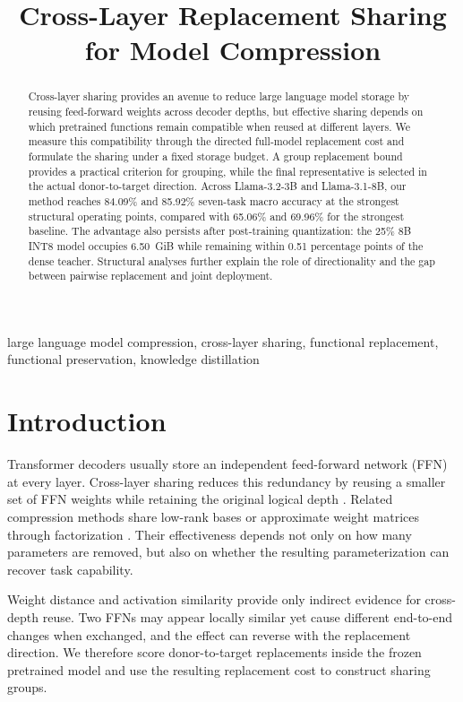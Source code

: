 \documentclass{article}
\title{Cross-Layer Replacement Sharing for Model Compression}
\begin{document}
\ninept
\maketitle

\begin{abstract}
Cross-layer sharing provides an avenue to reduce large language model storage by reusing feed-forward weights across decoder depths, but effective sharing depends on which pretrained functions remain compatible when reused at different layers. We measure this compatibility through the directed full-model replacement cost and formulate the sharing under a fixed storage budget. A group replacement bound provides a practical criterion for grouping, while the final representative is selected in the actual donor-to-target direction. Across Llama-3.2-3B and Llama-3.1-8B, our method reaches 84.09\% and 85.92\% seven-task macro accuracy at the strongest structural operating points, compared with 65.06\% and 69.96\% for the strongest baseline. The advantage also persists after post-training quantization: the 25\% 8B INT8 model occupies 6.50~GiB while remaining within 0.51 percentage points of the dense teacher. Structural analyses further explain the role of directionality and the gap between pairwise replacement and joint deployment.
\end{abstract}
\begin{keywords}
large language model compression, cross-layer sharing, functional replacement, functional preservation, knowledge distillation
\end{keywords}

\section{Introduction}
Transformer decoders usually store an independent feed-forward network (FFN)
at every layer. Cross-layer sharing reduces this redundancy by reusing a
smaller set of FFN weights while retaining the original logical depth
\cite{dehghani2019universal,lan2020albert}. Related compression methods share
low-rank bases or approximate weight matrices through factorization
\cite{wang2025basis,wang2025svdllm}. Their effectiveness depends not only on
how many parameters are removed, but also on whether the resulting
parameterization can recover task capability.

Weight distance and activation similarity provide only indirect evidence for
cross-depth reuse. Two FFNs may appear locally similar yet cause different
end-to-end changes when exchanged, and the effect can reverse with the
replacement direction. We therefore score donor-to-target replacements inside
the frozen pretrained model and use the resulting replacement cost to
construct sharing groups.
\end{document}
